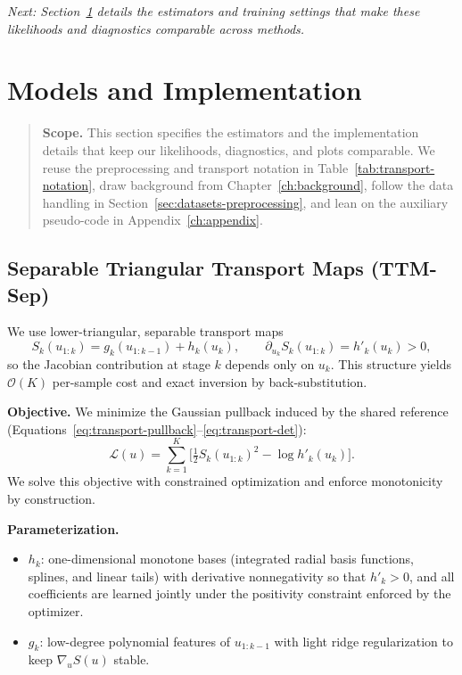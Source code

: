 \documentclass[11pt,a4paper,twoside]{book}\usepackage[]{graphicx}\usepackage[]{xcolor}
\begin{document}
\bigskip
\noindent\emph{Next: Section~\ref{sec:models-implementation} details the estimators and training settings that make these likelihoods and diagnostics comparable across methods.}


\section{Models and Implementation}\label{sec:models-implementation}


\begin{quote}
\textbf{Scope.} This section specifies the estimators and the implementation details that keep our likelihoods, diagnostics, and plots comparable. We reuse the preprocessing and transport notation in Table~\ref{tab:transport-notation}, draw background from Chapter~\ref{ch:background}, follow the data handling in Section~\ref{sec:datasets-preprocessing}, and lean on the auxiliary pseudo-code in Appendix~\ref{ch:appendix}.
\end{quote}

\subsection{Separable Triangular Transport Maps (TTM-Sep)}

We use lower-triangular, separable transport maps
\begin{equation}
 S_k(u_{1:k}) = g_k(u_{1:k-1}) + h_k(u_k), \qquad \partial_{u_k} S_k(u_{1:k}) = h'_k(u_k) > 0,
 \label{eq:ttm-separable-def}
\end{equation}
so the Jacobian contribution at stage $k$ depends only on $u_k$. This structure yields $\mathcal{O}(K)$ per-sample cost and exact inversion by back-substitution.

\textbf{Objective.} We minimize the Gaussian pullback induced by the shared reference (Equations~\eqref{eq:transport-pullback}--\eqref{eq:transport-det}):
\begin{equation}
 \mathcal{L}(u) = \sum_{k=1}^K \Big[ \tfrac{1}{2} S_k(u_{1:k})^2 - \log h'_k(u_k) \Big].
 \label{eq:ttm-separable-loss}
\end{equation}
We solve this objective with constrained optimization and enforce monotonicity by construction.

\textbf{Parameterization.}
\begin{itemize}
 \item $h_k$: one-dimensional monotone bases (integrated radial basis functions, splines, and linear tails) with derivative nonnegativity so that $h'_k > 0$, and all coefficients are learned jointly under the positivity constraint enforced by the optimizer.
 \item $g_k$: low-degree polynomial features of $u_{1:k-1}$ with light ridge regularization to keep $\nabla_u S(u)$ stable.
\end{itemize}
\end{document}
